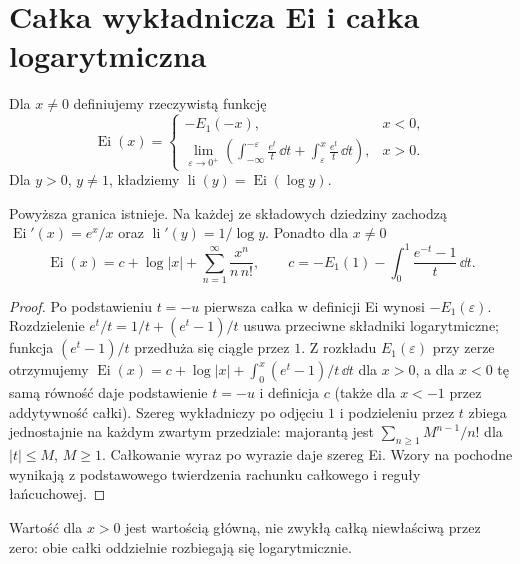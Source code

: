 \section{Całka wykładnicza Ei i całka logarytmiczna}
\begin{definicja}
\label{ma1:def:ei-li}
Dla $x\ne0$ definiujemy rzeczywistą funkcję
\[
 \operatorname{Ei}(x)=
 \begin{cases}
 -E_1(-x),&x<0,\\
 \displaystyle\lim_{\varepsilon\to0^+}
 \left(\int_{-\infty}^{-\varepsilon}\frac{e^t}{t}\,\dd t+
       \int_\varepsilon^x\frac{e^t}{t}\,\dd t\right),&x>0.
 \end{cases}
\]
Dla $y>0$, $y\ne1$, kładziemy
$\operatorname{li}(y)=\operatorname{Ei}(\log y)$.
\end{definicja}
\begin{stwierdzenie}
\label{ma1:prop:ei-li}
Powyższa granica istnieje. Na każdej ze składowych
dziedziny zachodzą
$\operatorname{Ei}'(x)=e^x/x$ oraz
$\operatorname{li}'(y)=1/\log y$.
Ponadto dla $x\ne0$
\[
 \operatorname{Ei}(x)=c+\log|x|+
                   \sum_{n=1}^\infty\frac{x^n}{n\,n!},
 \qquad
 c=-E_1(1)-\int_0^1\frac{e^{-t}-1}{t}\,\dd t .
\]
\end{stwierdzenie}
\begin{proof}
Po podstawieniu $t=-u$ pierwsza całka w definicji
Ei wynosi $-E_1(\varepsilon)$. Rozdzielenie
$e^t/t=1/t+(e^t-1)/t$ usuwa przeciwne składniki
logarytmiczne; funkcja $(e^t-1)/t$ przedłuża się
ciągle przez $1$. Z rozkładu $E_1(\varepsilon)$
przy zerze otrzymujemy
$\operatorname{Ei}(x)=c+\log|x|+
\int_0^x(e^t-1)/t\,\dd t$ dla $x>0$,
a dla $x<0$ tę samą równość daje podstawienie
$t=-u$ i definicja $c$ (także dla $x<-1$ przez
addytywność całki).
Szereg wykładniczy po odjęciu $1$ i podzieleniu
przez $t$ zbiega jednostajnie na każdym zwartym
przedziale: majorantą jest $\sum_{n\ge1}M^{n-1}/n!$
dla $|t|\le M$, $M\ge1$.
Całkowanie wyraz po wyrazie daje szereg Ei.
Wzory na pochodne wynikają z podstawowego
twierdzenia rachunku całkowego i reguły łańcuchowej.
\end{proof}
Wartość dla $x>0$ jest wartością główną, nie zwykłą
całką niewłaściwą przez zero: obie całki oddzielnie
rozbiegają się logarytmicznie.

